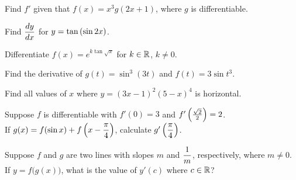 \documentclass[12pt]{article}
\begin{document}
\newpage

\Example Find $f'$ given that $f(x)=x^3 g(2x+1)$, where $g$ is differentiable.

\vspace{40mm}

\Example Find $\displaystyle\frac{dy}{dx}$ for $y=\tan \left( \sin 2x\right)$.

\vspace{40mm}

\Example Differentiate $f(x)=e^{k\tan \sqrt{x}}$ for $k\in\mathbb{R}$, $k\neq 0$.

\vspace{40mm}

\Example Find the derivative of $g(t)=\sin^3(3t)$ and $f(t)=3\sin t^3$.

\newpage

\Example Find all values of $x$ where $y=(3x-1)^2(5-x)^4$ is horizontal.

\vspace{50mm}

\Example Suppose $f$ is differentiable with $f'(0)=3$ and $f'\left(\frac{\sqrt{2}}{2}\right)=2$. \\

If $g(x)=f(\sin x)+f\left( x-\displaystyle\frac{\pi}{4}\right)$, calculate $g'\left(\displaystyle\frac{\pi}{4}\right)$.

\vspace{50mm}

\Example Suppose $f$ and $g$ are two lines with slopes $m$ and $\displaystyle\frac{1}{m}$, respectively, where $m\neq 0$. If $y=f\big(g(x)\big)$, what is the value of $y'(c)$ where $c\in\mathbb{R}$?
\end{document}

